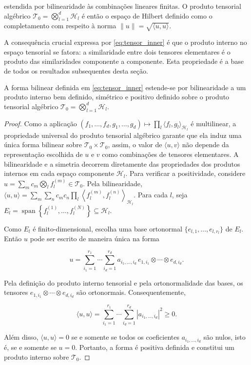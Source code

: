 \noindent estendida por bilinearidade às combinações lineares finitas. O produto tensorial algébrico $\mathcal{T}_0 = \bigotimes_{l=1}^{d} \mathcal{H}_l$ é então o espaço de Hilbert definido como o completamento com respeito à norma $\|u\| = \sqrt{\langle u,u \rangle}$.

A consequência crucial expressa por \eqref{eq:tensor_inner} é que o produto interno no espaço tensorial se fatora: a similaridade entre dois tensores elementares é o produto das similaridades componente a componente. Esta propriedade é a base de todos os resultados subsequentes desta seção.

\begin{proposition}\label{prop:inner_well_defined}
A forma bilinear definida em \eqref{eq:tensor_inner} estende-se por bilinearidade a um produto interno bem definido, simétrico e positivo definido sobre o produto tensorial algébrico $\mathcal{T}_0 = \bigotimes_{l=1}^{d} \mathcal{H}_l$.
\end{proposition}

\begin{proof}
Como a aplicação $(f_1,\dots,f_d,g_1,\dots,g_d)\mapsto \prod_l \langle f_l,g_l\rangle_{\mathcal{H}_l}$ é multilinear, a propriedade universal do produto tensorial algébrico garante que ela induz uma única forma bilinear sobre $\mathcal{T}_0\times\mathcal{T}_0$, assim, o valor de $\langle u,v\rangle$ não depende da representação escolhida de $u$ e $v$ como combinações de tensores elementares. A bilinearidade e a simetria decorrem diretamente das propriedades dos produtos internos em cada espaço componente $\mathcal{H}_l$. Para verificar a positividade, considere $u = \sum_{m} c_m \bigotimes_{l} f_l^{(m)} \in \mathcal{T}_0$. Pela bilinearidade, $\langle u,u\rangle = \sum_{m} \sum_{n} c_m c_n \prod_{l} \left\langle f_l^{(m)},f_l^{(n)} \right\rangle_{\mathcal{H}_l}$. Para cada $l$, seja $E_l = \operatorname{span} \left\{f_l^{(1)},\dots,f_l^{(N)} \right\} \subseteq \mathcal{H}_l$.

\noindent Como $E_l$ é finito-dimensional, escolha uma base ortonormal $\{e_{l,1},\dots,e_{l,r_l}\}$ de $E_l$. Então $u$ pode ser escrito de maneira única na forma

\begin{equation*}
    u = \sum_{i_1=1}^{r_1} \cdots \sum_{i_d=1}^{r_d} a_{i_1,\dots,i_d}\, e_{1,i_1}\otimes\cdots\otimes e_{d,i_d}.
\end{equation*}

\noindent Pela definição do produto interno tensorial e pela ortonormalidade das bases, os tensores $e_{1,i_1}\otimes\cdots\otimes e_{d,i_d}$ são ortonormais. Consequentemente,

\begin{equation*}
    \langle u,u\rangle = \sum_{i_1=1}^{r_1} \cdots \sum_{i_d=1}^{r_d} |a_{i_1,\dots,i_d}|^2 \geq 0.
\end{equation*}

\noindent Além disso, $\langle u,u\rangle=0$ se e somente se todos os coeficientes $a_{i_1,\dots,i_d}$ são nulos, isto é, se e somente se $u=0$. Portanto, a forma é positiva definida e constitui um produto interno sobre $\mathcal{T}_0$.
\end{proof}

